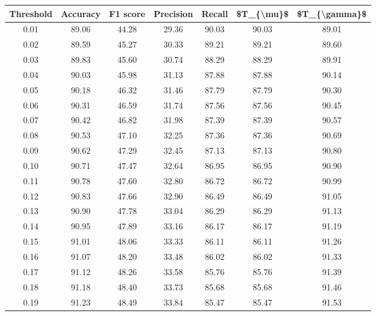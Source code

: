 \begin{tabular}{|c|c|c|c|c|c|c|}
\hline
 Threshold &  Accuracy &  F1 score &  Precision &  Recall &  \$T\_\{\textbackslash mu\}\$ &  \$T\_\{\textbackslash gamma\}\$ \\
\hline
      0.01 &     89.06 &     44.28 &      29.36 &   90.03 &      90.03 &         89.01 \\
      0.02 &     89.59 &     45.27 &      30.33 &   89.21 &      89.21 &         89.60 \\
      0.03 &     89.83 &     45.60 &      30.74 &   88.29 &      88.29 &         89.91 \\
      0.04 &     90.03 &     45.98 &      31.13 &   87.88 &      87.88 &         90.14 \\
      0.05 &     90.18 &     46.32 &      31.46 &   87.79 &      87.79 &         90.30 \\
      0.06 &     90.31 &     46.59 &      31.74 &   87.56 &      87.56 &         90.45 \\
      0.07 &     90.42 &     46.82 &      31.98 &   87.39 &      87.39 &         90.57 \\
      0.08 &     90.53 &     47.10 &      32.25 &   87.36 &      87.36 &         90.69 \\
      0.09 &     90.62 &     47.29 &      32.45 &   87.13 &      87.13 &         90.80 \\
      0.10 &     90.71 &     47.47 &      32.64 &   86.95 &      86.95 &         90.90 \\
      0.11 &     90.78 &     47.60 &      32.80 &   86.72 &      86.72 &         90.99 \\
      0.12 &     90.83 &     47.66 &      32.90 &   86.49 &      86.49 &         91.05 \\
      0.13 &     90.90 &     47.78 &      33.04 &   86.29 &      86.29 &         91.13 \\
      0.14 &     90.95 &     47.89 &      33.16 &   86.17 &      86.17 &         91.19 \\
      0.15 &     91.01 &     48.06 &      33.33 &   86.11 &      86.11 &         91.26 \\
      0.16 &     91.07 &     48.20 &      33.48 &   86.02 &      86.02 &         91.33 \\
      0.17 &     91.12 &     48.26 &      33.58 &   85.76 &      85.76 &         91.39 \\
      0.18 &     91.18 &     48.40 &      33.73 &   85.68 &      85.68 &         91.46 \\
      0.19 &     91.23 &     48.49 &      33.84 &   85.47 &      85.47 &         91.53 \\

\end{tabular}
